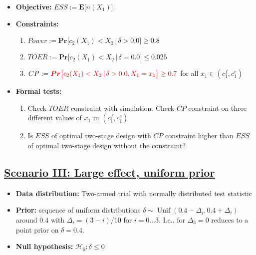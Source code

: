 \documentclass[]{book}
\providecommand{\tightlist}{%
  \setlength{\itemsep}{0pt}\setlength{\parskip}{0pt}}
\begin{document}
\begin{itemize}
\tightlist
\item
  \textbf{Objective:} \(ESS := \boldsymbol{E}\big[n(X_1)\big]\)
\item
  \textbf{Constraints:}

  \begin{enumerate}
  \def\labelenumi{\arabic{enumi}.}
  \tightlist
  \item
    \(Power := \boldsymbol{Pr}\big[c_2(X_1) < X_2\,|\,\delta>0.0\big] \geq 0.8\)
  \item
    \(TOER := \boldsymbol{Pr}\big[c_2(X_1) < X_2\,|\,\delta=0.0\big] \leq 0.025\)
  \item
    \(CP := \color{red}{\boldsymbol{Pr}\big[c_2(X_1) < X_2\,|\,\delta> 0.0, X_1 = x_1\big] \geq 0.7}\)
    for all \(x_1\in(c_1^f, c_1^e)\)
  \end{enumerate}
\item
  \textbf{Formal tests:}

  \begin{enumerate}
  \def\labelenumi{\arabic{enumi}.}
  \tightlist
  \item
    Check \(TOER\) constraint with simulation.
    Check \(CP\) constraint on three different values of \(x_1\) in
    \((c_1^f, c_1^e)\)
  \item
    Is \(ESS\) of optimal two-stage design with \(CP\) constraint higher than
    \(ESS\) of optimal two-stage design without the constraint?
  \end{enumerate}
\end{itemize}

\hypertarget{scenario-iii-large-effect-uniform-prior}{%
\subsection{\texorpdfstring{\protect\hyperlink{scenarioIII}{Scenario III: Large effect, uniform prior}}{Scenario III: Large effect, uniform prior}}\label{scenario-iii-large-effect-uniform-prior}}

\begin{itemize}
\tightlist
\item
  \textbf{Data distribution:} Two-armed trial with normally distributed test statistic
\item
  \textbf{Prior:} sequence of uniform distributions
  \(\delta\sim\operatorname{Unif}(0.4 - \Delta_i, 0.4 + \Delta_i)\)
  around \(0.4\) with \(\Delta_i=(3 - i)/10\) for \(i=0\ldots 3\).
  I.e., for \(\Delta_3=0\) reduces to a point prior on \(\delta=0.4\).
\item
  \textbf{Null hypothesis:} \(\mathcal{H}_0:\delta \leq 0\)
\end{itemize}
\end{document}
